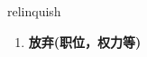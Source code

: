 
\begin{frame}
{\huge relinquish}
\begin{center}
\begin{enumerate}\Large
  \item \textbf{放弃(职位，权力等)}
\end{enumerate}
\end{center}
\end{frame}
